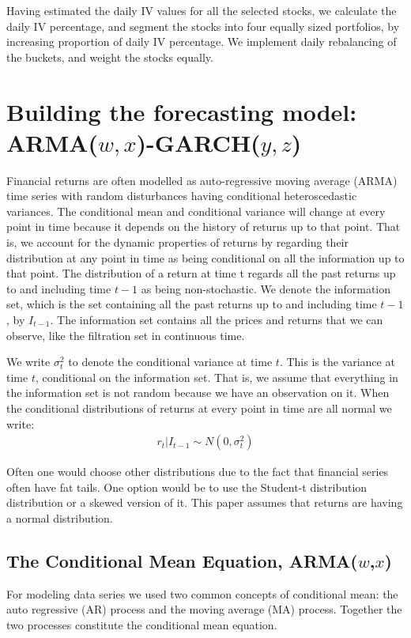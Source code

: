 Having estimated the daily IV values for all the selected stocks, we calculate the daily IV percentage, and segment the stocks into four equally sized portfolios, by increasing proportion of daily IV percentage. We implement daily rebalancing of the buckets, and weight the stocks equally. 

\section*{Building the forecasting model: ARMA($w,x$)-GARCH($y,z$)} 

Financial returns are often modelled as auto-regressive moving average (ARMA) time series with random disturbances having conditional heteroscedastic variances. The conditional mean and conditional variance will change at every point in time because it depends on the history of returns up to that point. That is, we account for the dynamic properties of returns by regarding their distribution at any point in time as being conditional on all the information up to that point. The distribution of a return at time t regards all the past returns up to and including time $t-1$ as being non-stochastic. We denote the information set, which is the set containing all the past returns up to and including time $t-1$, by $I_{t-1}$. The information set contains all the prices and returns that we can observe, like the filtration set in continuous time. 

We write $\sigma_t^2$ to denote the conditional variance at time $t$. This is the variance at time $t$, conditional on the information set. That is, we assume that everything in the information set is not random because we have an observation on it. When the conditional distributions of returns at every point in time are all normal we write:
\begin{align}
    r_t | I_{t-1} \sim N(0,{\sigma_t^2})
\end{align}

Often one would choose other distributions due to the fact that financial
series often have fat tails. One option would be to use the Student-t
distribution distribution or a skewed version of it. This paper assumes that returns are having a normal distribution. 

\subsection*{The Conditional Mean Equation, ARMA($w$,$x$)}

For modeling data series we used two common concepts of conditional mean: the auto regressive (AR) process and the moving average (MA) process. Together the two processes constitute the conditional mean equation. 

